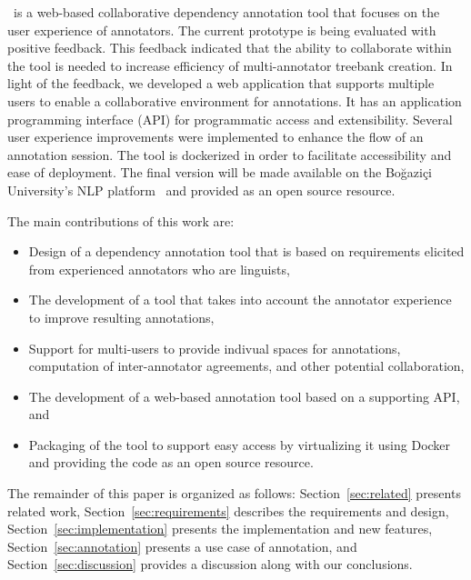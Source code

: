 \boatvtwo\ is a web-based collaborative dependency annotation tool that focuses on the user experience of annotators.
The current prototype is being evaluated with positive feedback.
This feedback indicated that the ability to collaborate within the tool is needed to increase efficiency of multi-annotator treebank creation.
In light of the feedback, we developed a web application that supports multiple users to enable a collaborative environment for annotations.
It has an application programming interface (API) for programmatic access and extensibility.
Several user experience improvements were implemented to enhance the flow of an annotation session.
The tool is dockerized in order to facilitate accessibility and ease of deployment.
The final version will be made available on the Boğaziçi University's NLP platform~\cite{DIP} and provided as an open source resource.

The main contributions of this work are:
\begin{itemize}
\setlength\itemsep{0em}
        \item Design of a dependency annotation tool that is based on requirements elicited from experienced annotators who are linguists,
        \item The development of a tool that takes into account the annotator experience to improve resulting annotations,
        \item Support for multi-users to provide indivual spaces for annotations, computation of inter-annotator agreements, and other potential collaboration,
        \item The development of a web-based annotation tool based on a supporting API, and
        \item Packaging of the tool to support easy access by virtualizing it using Docker~\cite{docker} and providing the code as an open source resource.
\end{itemize}

The remainder of this paper is organized as follows:
Section~\ref{sec:related} presents related work,
Section~\ref{sec:requirements} describes the requirements and design,
Section~\ref{sec:implementation} presents the implementation and new features,
Section~\ref{sec:annotation} presents a use case of annotation, and 
Section~\ref{sec:discussion} provides a discussion along with our conclusions.
